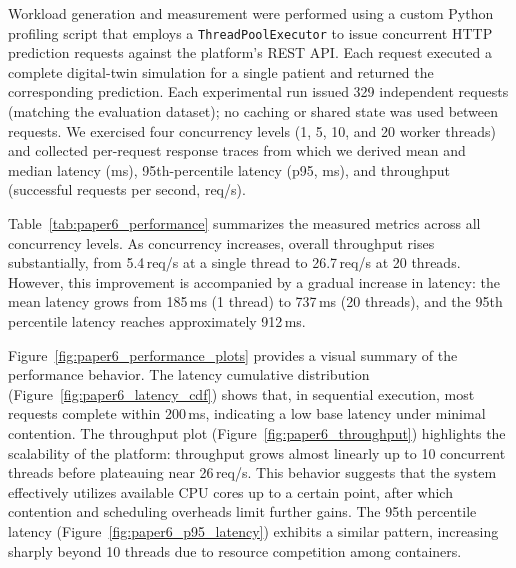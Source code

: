 Workload generation and measurement were performed using a custom Python profiling script that employs a \texttt{ThreadPoolExecutor} to issue concurrent HTTP prediction requests against the platform’s REST API. Each request executed a complete digital-twin simulation for a single patient and returned the corresponding prediction. Each experimental run issued 329 independent requests (matching the evaluation dataset); no caching or shared state was used between requests. We exercised four concurrency levels (1, 5, 10, and 20 worker threads) and collected per-request response traces from which we derived mean and median latency (ms), 95th-percentile latency (p95, ms), and throughput (successful requests per second, req/s).

Table~\ref{tab:paper6_performance} summarizes the measured metrics across all concurrency levels. As concurrency increases, overall throughput rises substantially, from 5.4\,req/s at a single thread to 26.7\,req/s at 20 threads. However, this improvement is accompanied by a gradual increase in latency: the mean latency grows from 185\,ms (1 thread) to 737\,ms (20 threads), and the 95th percentile latency reaches approximately 912\,ms.
\begin{table}[htbp]
\centering
\caption{Performance metrics across different concurrency levels.}
\label{tab:paper6_performance}
\end{table}
%
Figure~\ref{fig:paper6_performance_plots} provides a visual summary of the performance behavior. The latency cumulative distribution (Figure~\ref{fig:paper6_latency_cdf}) shows that, in sequential execution, most requests complete within 200\,ms, indicating a low base latency under minimal contention. The throughput plot (Figure~\ref{fig:paper6_throughput}) highlights the scalability of the platform: throughput grows almost linearly up to 10 concurrent threads before plateauing near 26\,req/s. This behavior suggests that the system effectively utilizes available CPU cores up to a certain point, after which contention and scheduling overheads limit further gains. The 95th percentile latency (Figure~\ref{fig:paper6_p95_latency}) exhibits a similar pattern, increasing sharply beyond 10 threads due to resource competition among containers.
